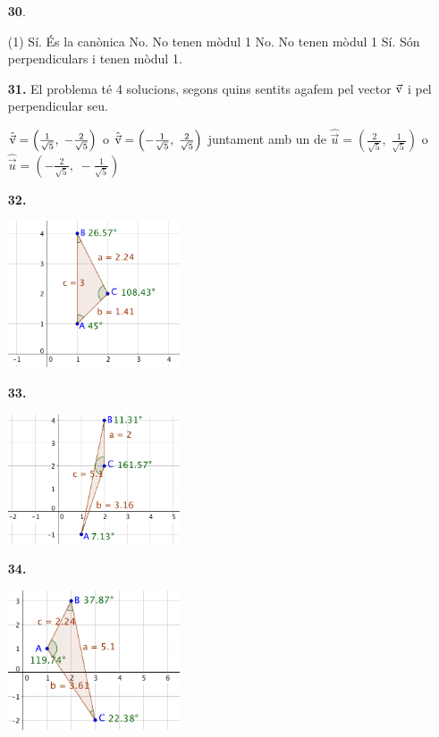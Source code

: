 \documentclass[a4paper, pdf, twoside]{book}
\begin{document}
\begin{multicols}{2}
\begin{enumerate}
 \item[\fontfamily{phv}\selectfont\color{blue}\textbf{30}. ] 
 \begin{tasks}[column-sep=1em, item-indent=1.3333em](1)
	 \task Sí. És la canònica
	 \task No. No tenen mòdul 1
	 \task No. No tenen mòdul 1
	 \task* Sí. Són perpendiculars i tenen mòdul 1.
\end{tasks}
\vspace{0.25cm}
\item[\fontfamily{phv}\selectfont\color{blue}\textbf{31. }] 
El problema té 4 solucions, segons quins sentits agafem pel vector $\vec{\mathrm{v}} $ i pel perpendicular seu.\par $\hat {\vec{\mathrm{v}} }=\left (\frac {1}{\sqrt {5}},\; -\frac {2}{\sqrt {5}}\right )$ o $\hat {\vec{\mathrm{v}} }=\left (-\frac {1}{\sqrt {5}},\; \frac {2}{\sqrt {5}}\right )$ juntament amb un de $\hat {\vec u}=\left (\frac {2}{\sqrt {5}},\; \frac {1}{\sqrt {5}}\right )$ o $\hat {\vec u}=\left (-\frac {2}{\sqrt {5}},\; -\frac {1}{\sqrt {5}}\right )$
\vspace{0.25cm}
\item[\fontfamily{phv}\selectfont\color{blue}\textbf{32. }] 
\mbox {}\par \includegraphics [width=0.4\textwidth ]{img-sol/t8-28}
\vspace{0.25cm}
\item[\fontfamily{phv}\selectfont\color{blue}\textbf{33. }] 
\mbox {}\par \includegraphics [width=0.4\textwidth ]{img-sol/t8-29}
\vspace{0.25cm}
\item[\fontfamily{phv}\selectfont\color{blue}\textbf{34. }] 
\mbox {}\par \includegraphics [width=0.4\textwidth ]{img-sol/t8-30}

\end{enumerate}
\end{multicols}
\end{document}
